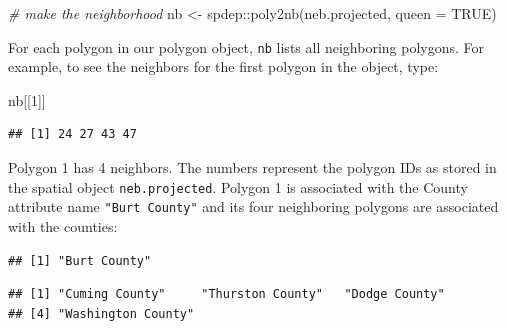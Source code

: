 \documentclass[]{article}
\newenvironment{Shaded}{\begin{snugshade}}{\end{snugshade}}
\newcommand{\AttributeTok}[1]{\textcolor[rgb]{0.77,0.63,0.00}{#1}}
\newcommand{\CommentTok}[1]{\textcolor[rgb]{0.56,0.35,0.01}{\textit{#1}}}
\newcommand{\ConstantTok}[1]{\textcolor[rgb]{0.00,0.00,0.00}{#1}}
\newcommand{\DecValTok}[1]{\textcolor[rgb]{0.00,0.00,0.81}{#1}}
\newcommand{\FunctionTok}[1]{\textcolor[rgb]{0.00,0.00,0.00}{#1}}
\newcommand{\NormalTok}[1]{#1}
\newcommand{\OtherTok}[1]{\textcolor[rgb]{0.56,0.35,0.01}{#1}}
\newcommand{\SpecialCharTok}[1]{\textcolor[rgb]{0.00,0.00,0.00}{#1}}
\begin{document}
\begin{Shaded}
\begin{Highlighting}[]
\CommentTok{\# make the neighborhood}
\NormalTok{nb }\OtherTok{\textless{}{-}}\NormalTok{ spdep}\SpecialCharTok{::}\FunctionTok{poly2nb}\NormalTok{(neb.projected, }\AttributeTok{queen =} \ConstantTok{TRUE}\NormalTok{)}
\end{Highlighting}
\end{Shaded}

For each polygon in our polygon object, \texttt{nb} lists all
neighboring polygons. For example, to see the neighbors for the first
polygon in the object, type:

\begin{Shaded}
\begin{Highlighting}[]
\NormalTok{nb[[}\DecValTok{1}\NormalTok{]]}
\end{Highlighting}
\end{Shaded}

\begin{verbatim}
## [1] 24 27 43 47
\end{verbatim}

Polygon 1 has 4 neighbors. The numbers represent the polygon IDs as
stored in the spatial object \texttt{neb.projected}. Polygon 1 is
associated with the County attribute name \texttt{"Burt\ County"} and
its four neighboring polygons are associated with the counties:

\begin{Shaded}
\end{Shaded}

\begin{verbatim}
## [1] "Burt County"
\end{verbatim}

\begin{Shaded}
\end{Shaded}

\begin{verbatim}
## [1] "Cuming County"     "Thurston County"   "Dodge County"     
## [4] "Washington County"
\end{verbatim}
\end{document}
